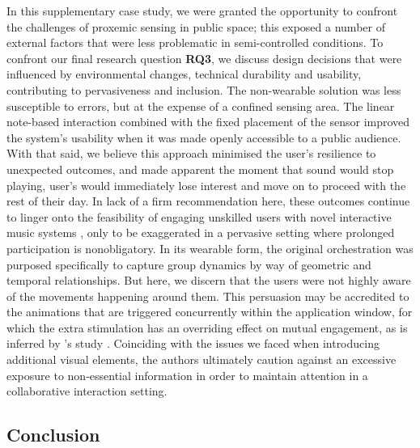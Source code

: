 In this supplementary case study, we were granted the opportunity to confront the challenges of proxemic sensing in public space; this exposed a number of external factors that were less problematic in semi-controlled conditions. To confront our final research question \textbf{RQ3}, we discuss design decisions that were influenced by environmental changes, technical durability and usability, contributing to pervasiveness and inclusion. The non-wearable solution was less susceptible to errors, but at the expense of a confined sensing area. The linear note-based interaction combined with the fixed placement of the sensor improved the system's usability when it was made openly accessible to a public audience. With that said, we believe this approach minimised the user's resilience to unexpected outcomes, and made apparent the moment that sound would stop playing, user's would immediately lose interest and move on to proceed with the rest of their day. In lack of a firm recommendation here, these outcomes continue to linger onto the feasibility of engaging unskilled users with novel interactive music systems \citep{holland_musical_2019}, only to be exaggerated in a pervasive setting where prolonged participation is nonobligatory. In its wearable form, the original orchestration was purposed specifically to capture group dynamics by way of geometric and temporal relationships. But here, we discern that the users were not highly aware of the movements happening around them. This persuasion may be accredited to the animations that are triggered concurrently within the application window, for which the extra stimulation has an overriding effect on mutual engagement, as is inferred by \citeauthor{bryan-kinns_mutual_2013}'s study \cite{bryan-kinns_mutual_2013}. Coinciding with the issues we faced when introducing additional visual elements, the authors ultimately caution against an excessive exposure to non-essential information in order to maintain attention in a collaborative interaction setting.


\subsection{Conclusion}

